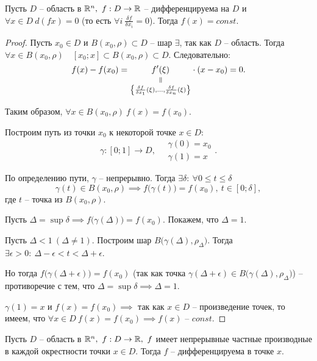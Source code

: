 \begin{corollary}
    Пусть $ D $ -- область в $ \mathbb{R}^n, \ f:D \rightarrow \mathbb{R} $ -- дифференцируема на $ D $ и $ \forall x \in D \ d(fx) = 0 $ (то есть $ \forall i \ \frac{\delta f}{\delta x_i} = 0 $). Тогда $ f(x) = const $.
\end{corollary}

\begin{proof}
    Пусть $ x_0 \in D $ и $ B(x_0,\rho)\subset D $ -- шар $ \exists $, так как $ D $ -- область. Тогда $ \forall x \in B(x_0,\rho) \quad [x_0;x]\subset B(x_0,\rho)\subset D $. Следовательно:
    \[
        f(x) - f(x_0) = \equalto{f'(\xi)}{\left\{\frac{\delta f}{\delta x_1}(\xi),\ldots,\frac{\delta f}{\delta x_n}(\xi)\right\}}\cdot (x-x_0) = 0.
    \]

    Таким образом, $ \forall x \in B(x_0,\rho) \ f(x) = f(x_0) $.

    Построим путь из точки $ x_0 $ к некоторой точке $ x \in D $:
    \[
        \gamma:[0;1]\rightarrow D, \quad \begin{array}{l}
            \gamma(0) = x_0 \\
            \gamma(1) = x
        \end{array}.
    \]

    По определению пути, $ \gamma $ -- непрерывно. Тогда $ \exists\delta: \ \forall 0 \leqslant t \leqslant\delta$
    \[
        \gamma(t) \in B(x_0,\rho) \implies f\big(\gamma(t)\big) = f(x_0), \ t \in [0;\delta],
    \] где $ t $ -- точка из $ B(x_0,\rho) $.

    Пусть $ \Delta = \sup\delta \implies f\big(\gamma(\Delta)\big) = f(x_0) $. Покажем, что $\Delta = 1$.

    Пусть $ \Delta < 1 \ (\Delta \ne 1) $. Построим шар $ B\big(\gamma(\Delta),\rho_\Delta\big) $. Тогда $ \exists \epsilon > 0: \ \Delta - \epsilon < t < \Delta + \epsilon $.

    Но тогда $ f\big(\gamma(\Delta + \epsilon)\big) = f(x_0) $ (так как точка $ \gamma(\Delta + \epsilon) \in B\big(\gamma(\Delta),\rho_\Delta\big) $) -- противоречие с тем, что $ \Delta = \sup\delta \implies \Delta = 1 $.

    $ \gamma(1) = x $ и $ f(x) = f(x_0) \implies $ так как $ x \in D $ -- произведение точек, то имеем, что $ \forall x \in D \ f(x) = f(x_0) \implies f(x)\text{ -- }const $.
\end{proof}

\begin{theorem}
    Пусть $ D $ -- область в $ \R^n, \ f:D \rightarrow\R, \ f $ имеет непрерывные частные производные в каждой окрестности точки $ x\in D $. Тогда $ f $ -- дифференцируема в точке $ x $.
\end{theorem}

